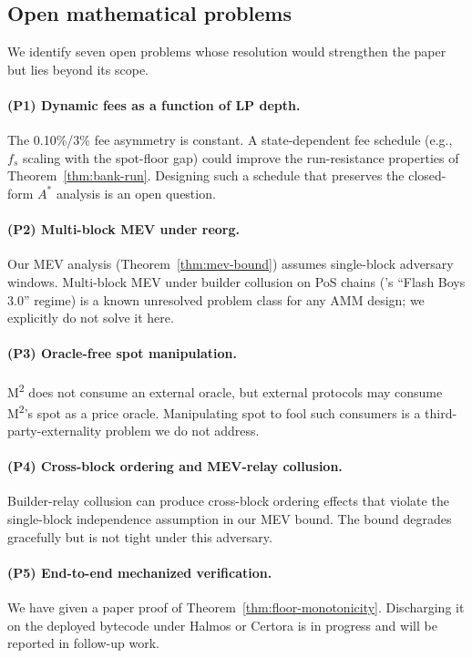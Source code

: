 \subsection{Open mathematical problems}
\label{sec:lim-open-math}

We identify seven open problems whose resolution would strengthen the paper but lies beyond its scope.

\paragraph{(P1) Dynamic fees as a function of LP depth.} The 0.10\%/3\% fee asymmetry is constant. A state-dependent fee schedule (e.g., $f_s$ scaling with the spot-floor gap) could improve the run-resistance properties of Theorem~\ref{thm:bank-run}. Designing such a schedule that preserves the closed-form $A^*$ analysis is an open question.

\paragraph{(P2) Multi-block MEV under reorg.} Our MEV analysis (Theorem~\ref{thm:mev-bound}) assumes single-block adversary windows. Multi-block MEV under builder collusion on PoS chains (\citet{Daian2020}'s ``Flash Boys 3.0'' regime) is a known unresolved problem class for any AMM design; we explicitly do not solve it here.

\paragraph{(P3) Oracle-free spot manipulation.} M\textsuperscript{2} does not consume an external oracle, but external protocols may consume M\textsuperscript{2}'s spot as a price oracle. Manipulating spot to fool such consumers is a third-party-externality problem we do not address.

\paragraph{(P4) Cross-block ordering and MEV-relay collusion.} Builder-relay collusion can produce cross-block ordering effects that violate the single-block independence assumption in our MEV bound. The bound degrades gracefully but is not tight under this adversary.

\paragraph{(P5) End-to-end mechanized verification.} We have given a paper proof of Theorem~\ref{thm:floor-monotonicity}. Discharging it on the deployed bytecode under Halmos or Certora is in progress and will be reported in follow-up work.


